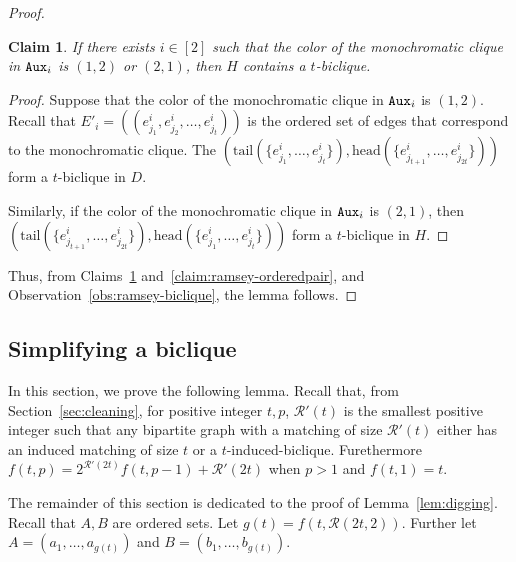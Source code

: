 \documentclass[a4paper,11pt]{article}
\theoremstyle{plain}
\newtheorem{claim}[theorem]{Claim}
\newtheorem{identification rule}{Identification Rule}
\theoremstyle{definition}
\theoremstyle{remark}
\newenvironment{claimproof}{\begin{proof}\renewcommand{\qedsymbol}{\claimqed}}{\end{proof}\renewcommand{\qedsymbol}{\plainqed}}
\let\plainqed\qedsymbol
\newcommand{\claimqed}{$\lrcorner$}
\newcommand{\head}{\text{head}}
\newcommand{\tail}{\text{tail}}
\newcommand{\aux}[1]{\textnormal{\texttt{Aux}}_{#1}}
\begin{document}
\begin{proof}
\begin{claim}\label{claim:ramsey-induced-skew}
If there exists $i \in [2]$ such that the color of the monochromatic clique in $\aux{i}$ is $(1,2)$ or $(2,1)$, then $H$ contains a $t$-biclique.
\end{claim}

\begin{claimproof}
Suppose that the color of the monochromatic clique in $\aux{i}$ is $(1,2)$. Recall that $E'_i =((e^i_{j_1}, e^i_{j_2}, \ldots , e^i_{j_{t}}))$ is the ordered set of edges that correspond to the monochromatic clique. The $(\tail(\{e^i_{j_1}, \ldots , \allowbreak e^i_{j_{t}}\}), \allowbreak \head(\{e^i_{j_{t +1 }}, \ldots, \allowbreak e^i_{j_{2t}}\}))$ form a $t$-biclique in $D$.

Similarly, if the color of the monochromatic clique in $\aux{i}$ is $(2,1)$, then $(\tail(\{e^i_{j_{t+1}}, \ldots, \allowbreak e^i_{j_{2t}}\}), \allowbreak  \head(\{e^i_{j_1}, \ldots, \allowbreak e^i_{j_{t}}\}))$ form a $t$-biclique in $H$.
\end{claimproof}

Thus, from Claims~\ref{claim:ramsey-induced-skew} and~\ref{claim:ramsey-orderedpair}, and Observation~\ref{obs:ramsey-biclique}, the lemma follows.
\end{proof}
\subsection{Simplifying a biclique}\label{sec:simplifyingbiclique}
In this section, we prove the following lemma. Recall that, from Section~\ref{sec:cleaning}, for positive integer $t,p$, $\mathcal{R}'(t)$ is the smallest positive integer such that any bipartite graph with a matching of size $\mathcal{R}'(t)$ either has an induced matching of size $t$ or a $t$-induced-biclique.
Furethermore $f(t,p) = 2^{\mathcal{R}'(2t)} f(t,p-1) + \mathcal{R}'(2t)$ 
when $p>1$ and $f(t,1)=t$. 

\digging*

The remainder of this section is dedicated to the proof of Lemma~\ref{lem:digging}. Recall that $A,B$ are ordered sets. Let $g(t) = f(t, \mathcal{R}(2t,2))$.
Further let $A=(a_1, \ldots, a_{g(t)})$ and $B=(b_1, \ldots, b_{g(t)})$.  
\end{document}
